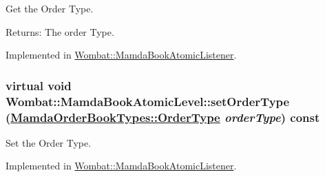 Get the Order Type. 

\begin{Desc}
\item[Returns:]The order Type. \end{Desc}


Implemented in \hyperlink{classWombat_1_1MamdaBookAtomicListener_0c3b1f7657aed8bba468e8500dded596}{Wombat::Mamda\-Book\-Atomic\-Listener}.\hypertarget{classWombat_1_1MamdaBookAtomicLevel_6b9fa11952fb136aceda2810f3131aeb}{
\subsubsection[setOrderType]{\setlength{\rightskip}{0pt plus 5cm}virtual void Wombat::Mamda\-Book\-Atomic\-Level::set\-Order\-Type (\hyperlink{classWombat_1_1MamdaOrderBookTypes_b1b75d93c83c5a1042c392ab46a27291}{Mamda\-Order\-Book\-Types::Order\-Type} {\em order\-Type}) const}}
\label{classWombat_1_1MamdaBookAtomicLevel_6b9fa11952fb136aceda2810f3131aeb}


Set the Order Type. 



Implemented in \hyperlink{classWombat_1_1MamdaBookAtomicListener_e79c2bbb2c0431a40df5788700a26c32}{Wombat::Mamda\-Book\-Atomic\-Listener}.